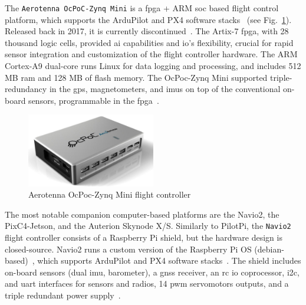 The \lstinline{Aerotenna OcPoC-Zynq Mini} is a \gls{fpga} + ARM \gls{soc} based
  flight control platform,  which supports the ArduPilot and PX4 software
  stacks~\cite{ocpoc} (see Fig.~\ref{fig:hw-ocpoc}). Released back in 2017, it
  is currently discontinued~\cite{ocpoc-discontinued}.
  The Artix-7 \gls{fpga}, with 28 thousand logic cells, provided \gls{ai}
  capabilities and \gls{io}'s flexibility, crucial for rapid sensor integration
  and customization of the flight controller hardware. The ARM Cortex-A9
  dual-core runs Linux for data logging and processing, and includes 512 MB
  \gls{ram} and 128 MB of flash memory. The OcPoc-Zynq Mini supported
  triple-redundancy in the \gls{gps}, magnetometers, and \glspl{imu} on top of
  the conventional on-board sensors, programmable in the
  \gls{fpga}~\cite{ocpoc}.

\begin{figure}[!hbt]
  \centering
  \includegraphics[width=0.5\textwidth]{./img/png/hw-ocpoc-zynq-mini.png} 
  \caption[Aerotenna OcPoc-Zynq Mini flight controller]{Aerotenna OcPoc-Zynq Mini flight controller~\cite{ocpoc}\footnotemark}%
  \label{fig:hw-ocpoc}
\end{figure}
%
%

The most notable companion computer-based platforms are the Navio2,
the PixC4-Jetson, and the Auterion Skynode X/S.  
Similarly to PilotPi, the \lstinline{Navio2} flight controller consists of a
Raspberry Pi shield, but the hardware design is closed-source.
Navio2 runs a custom version of the Raspberry Pi OS (debian-based)~\cite{navio2-sw}, which supports ArduPilot and PX4 software
stacks~\cite{arduPilot-Navio2,navio2-px4}.
  The shield includes on-board
  sensors (dual \gls{imu}, barometer), a \gls{gnss} receiver, an \gls{rc}
  \gls{io} coprocessor, \gls{i2c}, and
  \gls{uart} interfaces for sensors and radios, 14 \gls{pwm} servomotors
  outputs, and a triple redundant power supply~\cite{arduPilot-Navio2}.

